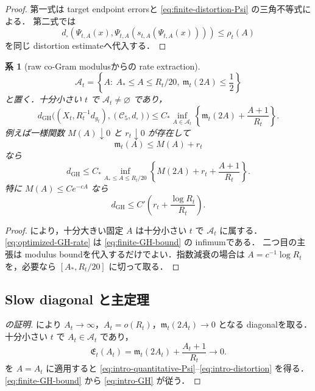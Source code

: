 \documentclass[a4paper,11pt]{ltjsarticle}
\numberwithin{equation}{section}
\theoremstyle{plain}
\newtheorem{corollary}[corollary]{系}
\theoremstyle{definition}
\theoremstyle{remark}
\newcommand{\cC}{\mathcal C}
\newcommand{\GH}{\mathrm{GH}}
\begin{document}
\begin{proof}
第一式は target endpoint errorsと \cref{eq:finite-distortion-Psi} の三角不等式による．
第二式では
\[
 d_\square\!\left(
  \Psi_{t,A}(x),
  \Psi_{t,A}(s_{t,A}(\Psi_{t,A}(x)))
 \right)\le\rho_t(A)
\]
を同じ distortion estimateへ代入する．
\end{proof}

\begin{corollary}[raw co-Gram modulusからの rate extraction]\label{cor:rate-extraction}
\[
 \mathscr A_t
 =\left\{A:\ A_*\le A\le R_t/20,
                 \ \mathfrak m_t(2A)\le\frac12\right\}
\]
と置く．十分小さい $t$ で $\mathscr A_t\ne\varnothing$ であり，
\begin{equation}\label{eq:optimized-GH-rate}
 d_{\GH}\bigl((X_t,R_t^{-1}d_{g_t}),(\cC_5,d_\square)\bigr)
 \le C_*\inf_{A\in\mathscr A_t}
 \left\{\mathfrak m_t(2A)+\frac{A+1}{R_t}\right\}.
\end{equation}
例えば一様関数 $M(A)\downarrow0$ と $r_t\downarrow0$ が存在して
\[
 \mathfrak m_t(A)\le M(A)+r_t
\]
なら
\begin{equation}\label{eq:abstract-rate-optimization}
 d_{\GH}\le C_*\inf_{A_*\le A\le R_t/20}
 \left\{M(2A)+r_t+\frac{A+1}{R_t}\right\}.
\end{equation}
特に $M(A)\le C e^{-cA}$ なら
\begin{equation}\label{eq:exponential-rate-corollary}
 d_{\GH}\le C'\left(r_t+\frac{\log R_t}{R_t}\right).
\end{equation}
\end{corollary}

\begin{proof}
 により，十分大きい固定 $A$ は十分小さい $t$ で $\mathscr A_t$ に属する．
\eqref{eq:optimized-GH-rate} は \cref{eq:finite-GH-bound} の infimumである．
二つ目の主張は modulus boundを代入するだけでよい．指数減衰の場合は
$A=c^{-1}\log R_t$ を，必要なら $[A_*,R_t/20]$ に切って取る．
\end{proof}

\subsection{Slow diagonal と主定理}

\begin{proof}[ の証明]
 により
$A_t\to\infty$，$A_t=o(R_t)$，$\mathfrak m_t(2A_t)\to0$ となる diagonalを取る．
十分小さい $t$ で $A_t\in\mathscr A_t$ であり，
\[
 \mathfrak E_t(A_t)=\mathfrak m_t(2A_t)+\frac{A_t+1}{R_t}\longrightarrow0.
\]
 を $A=A_t$ に適用すると
\eqref{eq:intro-quantitative-Psi}--\eqref{eq:intro-distortion} を得る．
\eqref{eq:finite-GH-bound} から \eqref{eq:intro-GH} が従う．
\end{proof}
\end{document}
